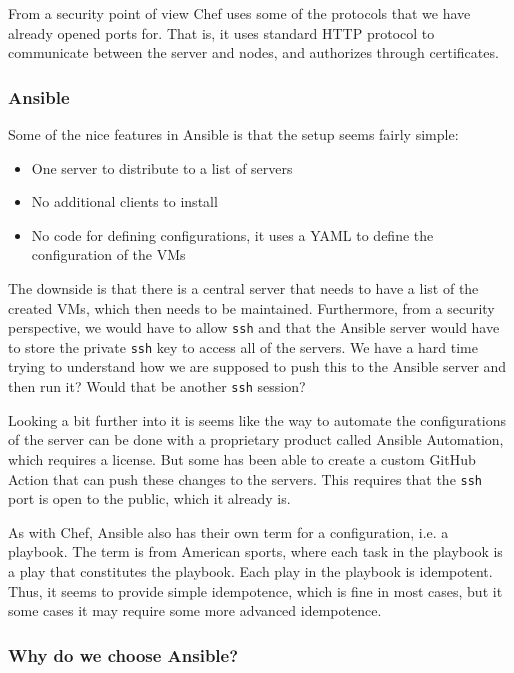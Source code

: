 From a security point of view Chef uses some of the protocols that we have already opened ports for. That is, it uses standard HTTP protocol to communicate between the server and nodes, and authorizes through certificates.

\subsubsection{Ansible}

Some of the nice features in Ansible is that the setup seems fairly simple:

\begin{itemize}
    \item One server to distribute to a list of servers
    \item No additional clients to install
    \item No code for defining configurations, it uses a YAML to define the configuration of the VMs
\end{itemize}

The downside is that there is a central server that needs to have a list of the created VMs, which then needs to be maintained. Furthermore, from a security perspective, we would have to allow \texttt{ssh} and that the Ansible server would have to store the private \texttt{ssh} key to access all of the servers. We have a hard time trying to understand how we are supposed to push this to the Ansible server and then run it? Would that be another \texttt{ssh} session?

Looking a bit further into it is seems like the way to automate the configurations of the server can be done with a proprietary product called Ansible Automation, which requires a license. But some has been able to create a custom GitHub Action that can push these changes to the servers. This requires that the \texttt{ssh} port is open to the public, which it already is.

As with Chef, Ansible also has their own term for a configuration, i.e. a playbook. The term is from American sports, where each task in the playbook is a play that constitutes the playbook. Each play in the playbook is idempotent. Thus, it seems to provide simple idempotence, which is fine in most cases, but it some cases it may require some more advanced idempotence.

\subsubsection{Why do we choose Ansible?}


